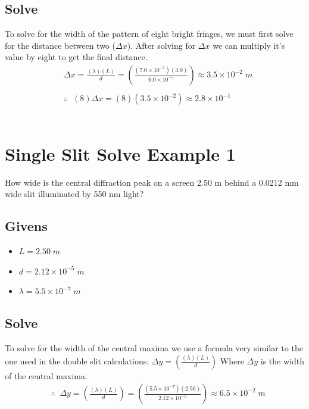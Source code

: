 \documentclass{article}
\begin{document}
\subsection*{Solve}
To solve for the width of the pattern of eight bright fringes, we must first solve for the distance between two ($\Delta x$). After solving for $\Delta x$ we can multiply it's value by eight to get the final distance.\\
\begin{align*}
     & \Delta x = \frac{(\lambda)(L)}{d} = \left(\frac{(7.0 \times 10^{-7})(3.0)}{6.0 \times 10^{-5}}\right) \approx 3.5 \times 10^{-2}\;m \\\\
     & \therefore\;\;(8)\Delta x = (8)(3.5 \times 10^{-2}) \approx 2.8 \times 10^{-1}
\end{align*}\leavevmode\\

\section{Single Slit Solve Example 1}
How wide is the central diffraction peak on a screen 2.50 m behind a 0.0212 mm wide slit illuminated by 550 nm light?
\subsection*{Givens}
\begin{itemize}
    \item $L = 2.50\;m$
    \item $d = 2.12 \times 10^{-5}\;m$
    \item $\lambda = 5.5 \times 10^{-7}\;m$
\end{itemize}\leavevmode
\subsection*{Solve}
To solve for the width of the central maxima we use a formula very similar to the one used in the double slit calculations: $\Delta y = \left(\frac{(\lambda)(L)}{d}\right)$ Where $\Delta y$ is the width of the central maxima.\\
\begin{align*}
     & \therefore\;\;\Delta y = \left(\frac{(\lambda)(L)}{d}\right) = \left(\frac{(5.5 \times 10^{-7})(2.50)}{2.12 \times 10^{-5}}\right) \approx 6.5 \times 10^{-2}\;m
\end{align*}\leavevmode\\
\end{document}
